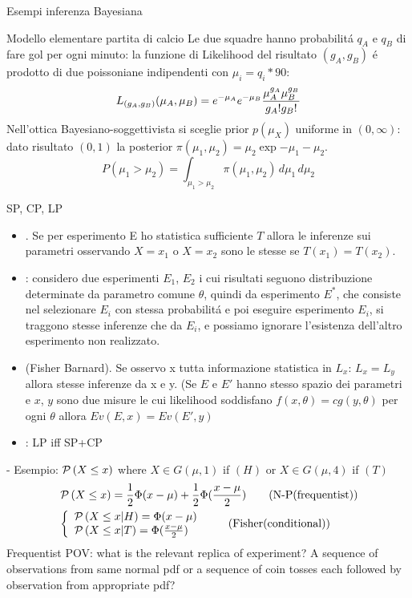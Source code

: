 \documentclass[asd-beamer.tex]{subfiles}%
\begin{document}
\begin{wordonframe}{Esempi inferenza Bayesiana}
\begin{block}{Modello elementare partita di calcio}
	Le due squadre hanno probabilit\'a $q_A$ e $q_B$ di fare gol per ogni minuto: la funzione di Likelihood del risultato $(g_A,g_B)$ \'e prodotto di due poissoniane indipendenti con $\mu_i=q_i*90$:
	\[L_{(g_A,g_B)}(\mu_A,\mu_B)=e^{-\mu_A}e^{-\mu_B}\frac{\mu_A^{g_A}\mu_B^{g_B}}{g_A!g_B!}\]
	Nell'ottica Bayesiano-soggettivista si sceglie prior $p(\mu_X)$ uniforme in $(0,\infty)$: dato risultato $(0,1)$ la posterior $\pi(\mu_1,\mu_2)=\mu_2\exp{-\mu_1-\mu_2}$.
	\[P(\mu_1>\mu_2)=\int_{\mu_1>\mu_2}\pi(\mu_1,\mu_2)\,d\mu_1\,d\mu_2\]
\end{block}
\end{wordonframe}

\begin{frame}{SP, CP, LP}
	\begin{itemize}
	\item {}. Se per esperimento E ho statistica sufficiente $T$ allora le inferenze sui parametri osservando $X=x_1$ o $X=x_2$ sono le stesse se $T(x_1)=T(x_2)$.
	\item {}: considero due esperimenti $E_1$, $E_2$ i cui risultati seguono distribuzione determinate da parametro comune $\theta$, quindi da esperimento $E^*$, che consiste nel selezionare $E_i$ con stessa probabilit\'a e poi eseguire esperimento $E_i$, si traggono stesse inferenze che da $E_i$, e possiamo ignorare l'esistenza dell'altro esperimento non realizzato.
	\item {} (Fisher Barnard). Se osservo x tutta informazione statistica in $L_x$: $L_x=L_y$ allora stesse inferenze da x e y. (Se $E$ e $E'$ hanno stesso spazio dei parametri e $x$, $y$ sono due misure le cui likelihood soddisfano $f(x,\theta)=cg(y,\theta)$ per ogni $\theta$ allora $Ev(E,x)=Ev(E',y)$
	\item {}: LP iff SP+CP
	\end{itemize}
     - Esempio: $\operatorname{\mathcal{P}}{(X\leq x)}$ where $X\in G(\mu,1)$ if $(H)$ or $X\in G(\mu,4)$ if $(T)$
    \begin{align*}
        &\operatorname{\mathcal{P}}{(X\leq x)}=\frac{1}{2}\Phi{(x-\mu)}+\frac{1}{2}\Phi(\frac{x-\mu}{2})\tag{N-P(frequentist)}\\
        &\left\{\begin{array}{l}\operatorname{\mathcal{P}}{(X\leq x|H)}=\Phi(x-\mu)\\\operatorname{\mathcal{P}}{(X\leq x|T)}=\Phi(\frac{x-\mu}{2})\\ \end{array}\right.\tag{Fisher(conditional)}
    \end{align*}
Frequentist POV: what is the relevant replica of experiment? A sequence of observations from same normal pdf or a sequence of coin tosses each followed by observation from appropriate pdf?
\end{frame}
\end{document}
